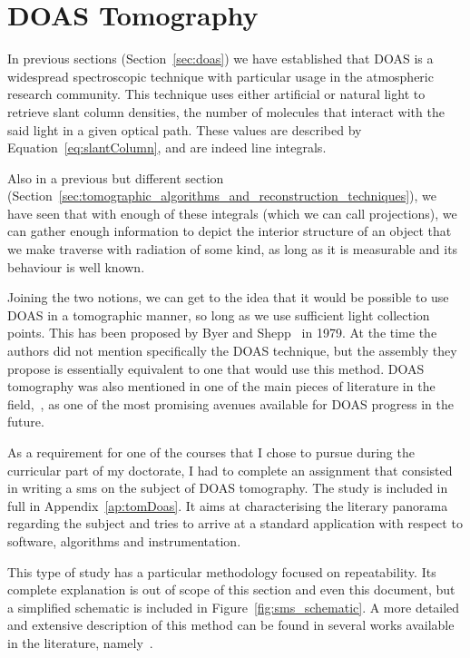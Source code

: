 \section{DOAS Tomography}%
\label{sec:doas_tomography}

In previous sections (Section~\ref{sec:doas}) we have established that
\gls{DOAS} is a widespread spectroscopic technique with particular usage
in the atmospheric research community. This technique uses either
artificial or natural light to retrieve slant column densities, the
number of molecules that interact with the said light in a given optical
path. These values are described by Equation~\ref{eq:slantColumn}, and
are indeed line integrals.

Also in a previous but different section
(Section~\ref{sec:tomographic_algorithms_and_reconstruction_techniques}),
we have seen that with enough of these integrals (which we can call
projections), we can gather enough information to depict the interior
structure of an object that we make traverse with radiation of some
kind, as long as it is measurable and its behaviour is well known.

Joining the two notions, we can get to the idea that it would be
possible to use \gls{DOAS} in a tomographic manner, so long as we use
sufficient light collection points. This has been proposed by Byer and
Shepp~\cite{Byer1979} in 1979. At the time the authors did not mention
specifically the \gls{DOAS} technique, but the assembly they propose is
essentially equivalent to one that would use this method. \gls{DOAS}
tomography was also mentioned in one of the main pieces of literature in
the field,~\cite{Platt2007}, as one of the most promising avenues
available for \gls{DOAS} progress in the future.

As a requirement for one of the courses that I chose to pursue during
the curricular part of my doctorate, I had to complete an assignment
that consisted in writing a \acrlong{sms} on the subject of \gls{DOAS}
tomography. The study is included in full in Appendix~\ref{ap:tomDoas}.
It aims at characterising the literary panorama regarding the subject
and tries to arrive at a standard application with respect to software,
algorithms and instrumentation.

This type of study has a particular methodology focused on
repeatability. Its complete explanation is out of scope of this section
and even this document, but a simplified schematic is included in
Figure~\ref{fig:sms_schematic}. A more detailed and extensive
description of this method can be found in several works available in
the literature, namely~\cite{Kitchenham2007, Kitchenham2009, Souza2019}.

